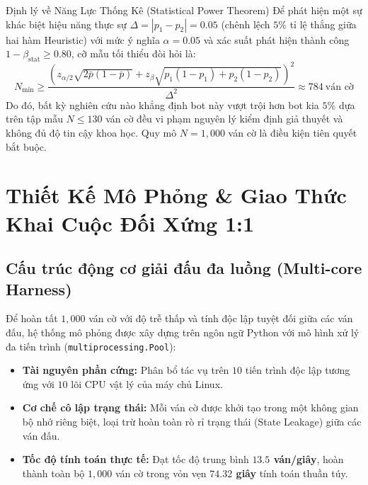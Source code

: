 \documentclass[11pt,a4paper]{article}
\begin{document}
\begin{principlebox}{Định lý về Năng Lực Thống Kê (Statistical Power Theorem)}
Để phát hiện một sự khác biệt hiệu năng thực sự $\Delta = |p_1 - p_2| = 0.05$ (chênh lệch $5\%$ tỉ lệ thắng giữa hai hàm Heuristic) với mức ý nghĩa $\alpha = 0.05$ và xác suất phát hiện thành công $1 - \beta_{\text{stat}} \ge 0.80$, cỡ mẫu tối thiểu đòi hỏi là:
\begin{equation}
N_{\min} \ge \frac{\left(z_{\alpha/2} \sqrt{2 \bar{p}(1-\bar{p})} + z_{\beta} \sqrt{p_1(1-p_1) + p_2(1-p_2)}\right)^2}{\Delta^2} \approx 784 \ \text{ván cờ}
\end{equation}
Do đó, bất kỳ nghiên cứu nào khẳng định bot này vượt trội hơn bot kia $5\%$ dựa trên tập mẫu $N \le 130$ ván cờ đều vi phạm nguyên lý kiểm định giả thuyết và không đủ độ tin cậy khoa học. Quy mô $N = 1{,}000$ ván cờ là điều kiện tiên quyết bắt buộc.
\end{principlebox}


\FloatBarrier
\section{Thiết Kế Mô Phỏng \& Giao Thức Khai Cuộc Đối Xứng 1:1}

\subsection{Cấu trúc động cơ giải đấu đa luồng (Multi-core Harness)}
Để hoàn tất $1{,}000$ ván cờ với độ trễ thấp và tính độc lập tuyệt đối giữa các ván đấu, hệ thống mô phỏng được xây dựng trên ngôn ngữ Python với mô hình xử lý đa tiến trình (\texttt{multiprocessing.Pool}):
\begin{itemize}
    \item \textbf{Tài nguyên phần cứng:} Phân bổ tác vụ trên $10$ tiến trình độc lập tương ứng với $10$ lõi CPU vật lý của máy chủ Linux.
    \item \textbf{Cơ chế cô lập trạng thái:} Mỗi ván cờ được khởi tạo trong một không gian bộ nhớ riêng biệt, loại trừ hoàn toàn rò rỉ trạng thái (State Leakage) giữa các ván đấu.
    \item \textbf{Tốc độ tính toán thực tế:} Đạt tốc độ trung bình \textbf{$13.5$ ván/giây}, hoàn thành toàn bộ $1{,}000$ ván cờ trong vỏn vẹn \textbf{$74.32$ giây} tính toán thuần túy.
\end{itemize}
\end{document}
